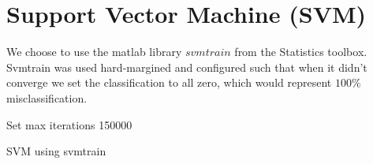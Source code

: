 \section{Support Vector Machine (SVM)}
We choose to use the matlab library $svmtrain$ \citep{svmtrain_ref} from the Statistics toolbox. Svmtrain was used hard-margined and configured such that when it didn't converge we set the classification to all zero, which would represent $100\%$ misclassification. \\
\begin{algorithm}[H]
\label{algorithm:SVM}
\SetAlgoLined
{}

Set max iterations 150000 \\
 \caption{SVM using svmtrain}
\end{algorithm}



